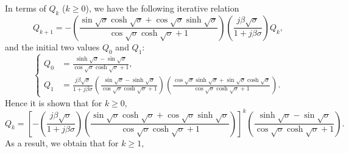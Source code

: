 \documentclass{article}
\begin{document}
In terms of $Q_k$ ($k \geq 0$), we have the following iterative relation
\begin{equation}
    Q_{k+1} = - \left( \frac{ \sin\sqrt{\sigma} \cosh\sqrt{\sigma} + \cos\sqrt{\sigma} \sinh\sqrt{\sigma} }{ \cos\sqrt{\sigma }\cosh\sqrt{\sigma }+1 } \right) \left( \frac{j \beta \sqrt{\sigma }}{1+j \beta \sigma } \right) Q_k,
\end{equation}
and the initial two values $Q_0$ and $Q_1$:
\begin{equation}
    \left\{\begin{aligned}
        Q_0 &= \frac{\sinh\sqrt{\sigma }-\sin\sqrt{\sigma }}{\cos\sqrt{\sigma } \cosh\sqrt{\sigma }+1}, \\
        Q_{1} &= \frac{j \beta  \sqrt{\sigma }}{1+j \beta  \sigma } \left(\frac{\sin\sqrt{\sigma } -\sinh\sqrt{\sigma }}{\cos\sqrt{\sigma } \cosh\sqrt{\sigma }+1} \right)  \left( \frac{\cos\sqrt{\sigma } \sinh\sqrt{\sigma }+\sin\sqrt{\sigma } \cosh\sqrt{\sigma }}{\cos\sqrt{\sigma } \cosh\sqrt{\sigma }+1} \right).
    \end{aligned}\right.
\end{equation}
Hence it is shown that for $k \geq 0$,
\begin{equation}
    Q_{k} = \left[- \left( \frac{j \beta \sqrt{\sigma }}{1+j \beta \sigma } \right) \left( \frac{ \sin\sqrt{\sigma} \cosh\sqrt{\sigma} + \cos\sqrt{\sigma} \sinh\sqrt{\sigma} }{ \cos\sqrt{\sigma }\cosh\sqrt{\sigma }+1 } \right)  \right]^k \left( \frac{\sinh\sqrt{\sigma }-\sin\sqrt{\sigma }}{\cos\sqrt{\sigma } \cosh\sqrt{\sigma }+1} \right).
\end{equation}
As a result, we obtain that for $k \geq 1$,
\footnotesize
\end{document}
